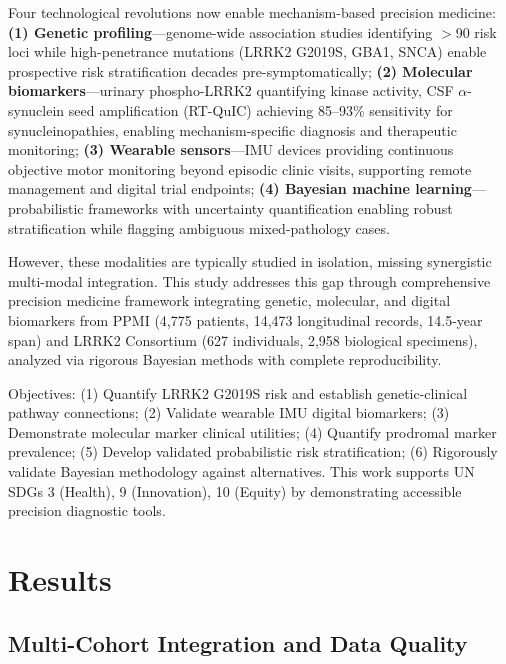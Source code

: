 \documentclass[11pt]{article}
\begin{document}
Four technological revolutions now enable mechanism-based precision medicine: \textbf{(1) Genetic profiling}—genome-wide association studies identifying $>$90 risk loci\cite{nalls2019identification} while high-penetrance mutations (LRRK2 G2019S, GBA1, SNCA) enable prospective risk stratification decades pre-symptomatically\cite{marder2015age,west2023lrrk2}; \textbf{(2) Molecular biomarkers}—urinary phospho-LRRK2 quantifying kinase activity\cite{fraser2016ser}, CSF $\alpha$-synuclein seed amplification (RT-QuIC) achieving 85--93\% sensitivity for synucleinopathies\cite{siderowf2023csf,concha2024alpha}, enabling mechanism-specific diagnosis and therapeutic monitoring; \textbf{(3) Wearable sensors}—IMU devices providing continuous objective motor monitoring beyond episodic clinic visits\cite{mirelman2024wearable,horak2015objective,adams2024using}, supporting remote management and digital trial endpoints; \textbf{(4) Bayesian machine learning}—probabilistic frameworks with uncertainty quantification enabling robust stratification while flagging ambiguous mixed-pathology cases\cite{zhang2023machine,collins2024tripod}.

However, these modalities are typically studied in isolation, missing synergistic multi-modal integration\cite{espay2024disease}. This study addresses this gap through comprehensive precision medicine framework integrating genetic, molecular, and digital biomarkers from PPMI (4,775 patients, 14,473 longitudinal records, 14.5-year span)\cite{marek2018parkinson} and LRRK2 Consortium (627 individuals, 2,958 biological specimens)\cite{marder2015age,west2023lrrk2}, analyzed via rigorous Bayesian methods with complete reproducibility.

Objectives: (1) Quantify LRRK2 G2019S risk and establish genetic-clinical pathway connections; (2) Validate wearable IMU digital biomarkers; (3) Demonstrate molecular marker clinical utilities; (4) Quantify prodromal marker prevalence; (5) Develop validated probabilistic risk stratification; (6) Rigorously validate Bayesian methodology against alternatives. This work supports UN SDGs 3 (Health), 9 (Innovation), 10 (Equity) by demonstrating accessible precision diagnostic tools.

\section{Results}

\subsection{Multi-Cohort Integration and Data Quality}
\end{document}
